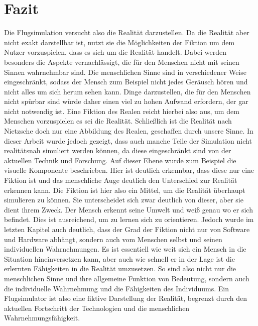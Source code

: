 \documentclass[12pt]{article}
\begin{document}
\section{Fazit}
Die Flugsimulation versucht also die Realität darzustellen. Da die Realität aber nicht exakt darstellbar ist, nutzt sie die Möglichkeiten der Fiktion um dem Nutzer vorzuspielen, dass es sich um die Realität handelt. Dabei werden besonders die Aspekte vernachlässigt, die für den Menschen nicht mit seinen Sinnen wahrnehmbar sind. Die menschlichen Sinne sind in verschiedener Weise eingeschränkt, sodass der Mensch zum Beispiel nicht jedes Geräusch hören und nicht alles um sich herum sehen kann. Dinge darzustellen, die für den Menschen nicht spürbar sind würde daher einen viel zu hohen Aufwand erfordern, der gar nicht notwendig ist. Eine Fiktion des Realen reicht hierbei also aus, um dem Menschen vorzuspielen es sei die Realität. Schließlich ist die Realität nach Nietzsche doch nur eine Abbildung des Realen, geschaffen durch unsere Sinne. \newline
In dieser Arbeit wurde jedoch gezeigt, dass auch manche Teile der Simulation nicht realitätsnah simuliert werden können, da diese eingeschränkt sind von der aktuellen Technik und Forschung. Auf dieser Ebene wurde zum Beispiel die visuelle Komponente beschrieben. Hier ist deutlich erkennbar, dass diese nur eine Fiktion ist und das menschliche Auge deutlich den Unterschied zur Realität erkennen kann. Die Fiktion ist hier also ein Mittel, um die Realität überhaupt simulieren zu können. Sie unterscheidet sich zwar deutlich von dieser, aber sie dient ihrem Zweck. Der Mensch erkennt seine Umwelt und weiß genau wo er sich befindet. Dies ist ausreichend, um zu lernen sich zu orientieren.\newline
Jedoch wurde im letzten Kapitel auch deutlich, dass der Grad der Fiktion nicht nur von Software und Hardware abhängt, sondern auch vom Menschen selbst und seinen individuellen Wahrnehmungen.\newline
Es ist essentiell wie weit sich ein Mensch in die Situation hineinversetzen kann, aber auch wie schnell er in der Lage ist die erlernten Fähigkeiten in die Realität umzusetzen. So sind also nicht nur die menschlichen Sinne und ihre allgemeine Funktion von Bedeutung, sondern auch die individuelle Wahrnehmung und die Fähigkeiten des Individuums.\newline
Ein Flugsimulator ist also eine fiktive Darstellung der Realität, begrenzt durch den aktuellen Fortschritt der Technologien und die menschlichen Wahrnehmungsfähigkeit.
\end{document}
